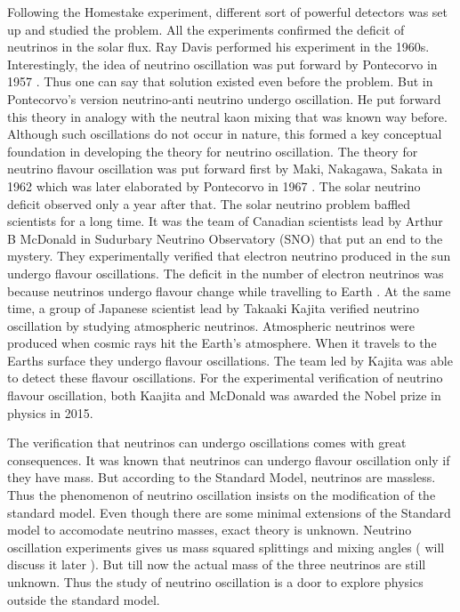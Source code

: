 \documentclass[12pt,a4paper]{report}
\begin{document}
Following the Homestake experiment, different sort of powerful detectors was set up and studied the problem. All the experiments confirmed the deficit of neutrinos in the solar flux. Ray Davis performed his experiment in the 1960s. Interestingly, the idea of neutrino oscillation was put forward by Pontecorvo in 1957 \cite{ponte57}. Thus one can say that solution existed even before the problem. But in Pontecorvo’s version neutrino-anti neutrino undergo oscillation. He put forward this theory in analogy with the neutral kaon mixing that was known way before. Although such oscillations do not occur in nature, this formed a key conceptual foundation in developing the theory for neutrino oscillation. The theory for neutrino flavour oscillation was put forward first by Maki, Nakagawa, Sakata in 1962 \cite{maki} which was later elaborated by Pontecorvo in 1967 \cite{ponte68}. The solar neutrino deficit observed only a year after that. The solar neutrino problem baffled scientists for a long time. It was the team of Canadian scientists lead by Arthur B McDonald in Sudurbary Neutrino Observatory (SNO) that put an end to the mystery. They experimentally verified that electron neutrino produced in the sun undergo flavour oscillations. The deficit in the number of electron neutrinos was because neutrinos undergo flavour change while travelling to Earth \cite{mcdonald}. At the same time, a group of Japanese scientist lead by Takaaki Kajita verified neutrino oscillation by studying atmospheric neutrinos. Atmospheric neutrinos were produced when cosmic rays hit the Earth’s atmosphere. When it travels to the Earths surface they undergo flavour oscillations. The team led by Kajita was able to detect these flavour oscillations. For the experimental verification of neutrino flavour oscillation, both Kaajita and McDonald was awarded the Nobel prize in physics in 2015.

The verification that neutrinos can undergo oscillations comes with great consequences. It was known that neutrinos can undergo flavour oscillation only if they have mass. But according to the Standard Model, neutrinos are massless. Thus the phenomenon of neutrino oscillation insists on the modification of the standard model. Even though there are some minimal extensions of the Standard model to accomodate neutrino masses, exact theory is unknown.  Neutrino oscillation experiments gives us mass squared splittings and mixing angles ( will discuss it later ). But till now the actual mass of the three neutrinos are still unknown. Thus the study of neutrino oscillation is a door to explore physics outside the standard model. 
\end{document}
